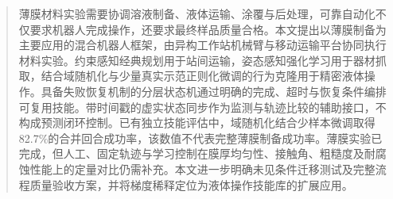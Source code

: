 \begin{abstract}
薄膜材料实验需要协调溶液制备、液体运输、涂覆与后处理，可靠自动化不仅要求机器人完成操作，还要求最终样品质量合格。本文提出以薄膜制备为主要应用的混合机器人框架，由异构工作站机械臂与移动运输平台协同执行材料实验。约束感知经典规划用于站间运输，姿态感知强化学习用于器材抓取，结合域随机化与少量真实示范正则化微调的行为克隆用于精密液体操作。具备失败恢复机制的分层状态机通过明确的完成、超时与恢复条件编排可复用技能。带时间戳的虚实状态同步作为监测与轨迹比较的辅助接口，不构成预测闭环控制。已有独立技能评估中，域随机化结合少样本微调取得82.7\%的合并回合成功率，该数值不代表完整薄膜制备成功率。薄膜实验已完成，但人工、固定轨迹与学习控制在膜厚均匀性、接触角、粗糙度及耐腐蚀性能上的定量对比仍需补充。本文进一步明确未见条件迁移测试及完整流程质量验收方案，并将梯度稀释定位为液体操作技能库的扩展应用。
\end{abstract}

